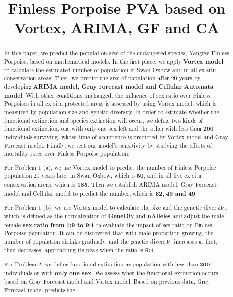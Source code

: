 \documentclass{mcmthesis}
\title{Finless Porpoise PVA based on Vortex, ARIMA, GF and CA}
\numberwithin{figure}{section}
\numberwithin{table}{section}
\numberwithin{equation}{section}
\begin{document}
\renewcommand{\algorithmicrequire}{\textbf{Input:}}  %
\renewcommand{\algorithmicensure}{\textbf{Output:}} %

\begin{abstract}

In this paper, we predict the population size of the endangered species, Yangtze Finless Porpoise, based on
mathematical models. 
In the first place, we apply \textbf{Vortex model} to calculate the estimated number of 
population in Swan Oxbow and in all ex situ conservation areas. Then, we 
predict the size of population after 20 years by developing \textbf{ARIMA model, 
Gray Forecast model and Cellular Automata model}. With other conditions unchanged, 
the influence of sex ratio over Finless Porpoises in all ex situ protected areas
is assessed by using Vortex model, which is measured by population size and
genetic diversity. In order to estimate whether the functional extinction and
species extinction will occur, we define two kinds of functional extinction, one with 
only one sex left and the other with less than \textbf{200} individuals surviving, whose time 
of occurrence is predicted by Vortex model and Gray Forecast model. 
Finally, we test our model's sensitivity by studying the effects of 
mortality rates over Finless Porpoise population. 
\par
For Problem 1 (a), we use Vortex model to predict the number of Finless Porpoise
population 20 years later in Swan Oxbow, which is \textbf{50}, and in all five ex situ 
conservation areas, which is \textbf{185}. Then we establish ARIMA model, 
Gray Forecast model and Cellular model to predict the number, which is
\textbf{62, 49 and 49}.
\par
For Problem 1 (b), we use Vortex model to calculate the size and the genetic diversity, which
is defined as the normalization of \textbf{GeneDiv} and \textbf{nAlleles} and adjust the male-female 
\textbf{sex ratio from 1:9 to 9:1} to evaluate the impact of sex ratio on Finless Porpoise population. 
It can be discovered that with male proportion growing, 
the number of population shrinks gradually, and the genetic diversity
increases at first, then decreases, approaching its peak when the ratio is \textbf{6:4}.
\par
For Problem 2, we define functional extinction as population with 
less than \textbf{200} individuals or with \textbf{only one sex}. We assess when 
the functional extinction occurs based on Gray Forecast model and 
Vortex model. Based on previous data, Gray Forecast model predicts the

\end{abstract}
\end{document}

